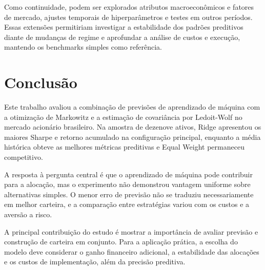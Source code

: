 \documentclass[12pt,a4paper]{article}
\begin{document}
Como continuidade, podem ser explorados atributos macroeconômicos e fatores de mercado, ajustes temporais de hiperparâmetros e testes em outros períodos. Essas extensões permitiriam investigar a estabilidade dos padrões preditivos diante de mudanças de regime e aprofundar a análise de custos e execução, mantendo os benchmarks simples como referência.

\section{Conclusão}

Este trabalho avaliou a combinação de previsões de aprendizado de máquina com a otimização de Markowitz e a estimação de covariância por Ledoit-Wolf no mercado acionário brasileiro. Na amostra de dezenove ativos, Ridge apresentou os maiores Sharpe e retorno acumulado na configuração principal, enquanto a média histórica obteve as melhores métricas preditivas e Equal Weight permaneceu competitivo.

A resposta à pergunta central é que o aprendizado de máquina pode contribuir para a alocação, mas o experimento não demonstrou vantagem uniforme sobre alternativas simples. O menor erro de previsão não se traduziu necessariamente em melhor carteira, e a comparação entre estratégias variou com os custos e a aversão a risco.

A principal contribuição do estudo é mostrar a importância de avaliar previsão e construção de carteira em conjunto. Para a aplicação prática, a escolha do modelo deve considerar o ganho financeiro adicional, a estabilidade das alocações e os custos de implementação, além da precisão preditiva.
\end{document}
